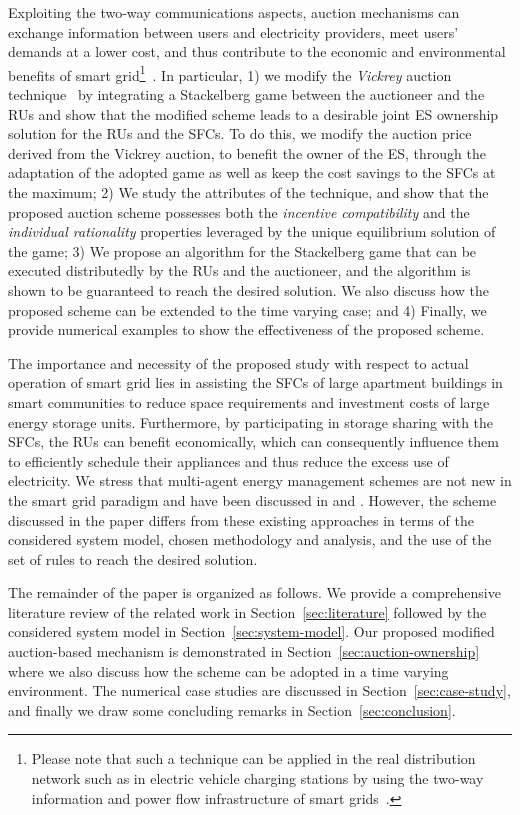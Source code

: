 \documentclass[journal,10pt]{IEEEtran}
\begin{document}
Exploiting the two-way communications aspects, auction mechanisms can exchange information between users and electricity providers, meet users' demands at a lower cost, and thus contribute to the economic and environmental benefits of smart grid\footnote{Please note that such a technique can be applied in the real distribution network such as in electric vehicle charging stations by using the two-way information and power flow infrastructure of smart grids~\cite{Fang-J-CST:2012}.}~\cite{Ma-JTSG:2014}. In particular, 1) we modify the \emph{Vickrey} auction technique~\cite{Vickrey-JF:1961} by integrating a Stackelberg game between the auctioneer and the RUs and show that the modified scheme leads to a desirable joint ES ownership solution for the RUs and the SFCs. To do this, we modify the auction price derived from the Vickrey auction, to benefit the owner of the ES, through the adaptation of the adopted game as well as keep the cost savings to the SFCs at the maximum; 2)  We study the attributes of the technique, and show that the proposed auction scheme possesses both the \emph{incentive compatibility} and the \emph{individual rationality} properties leveraged by the unique equilibrium solution of the game; 3) We propose an algorithm for the Stackelberg game that can be executed distributedly by the RUs and the auctioneer, and the algorithm is shown to be guaranteed to reach the desired solution. We also discuss how the proposed scheme can be extended to the time varying case; and 4) Finally, we provide numerical examples to show the effectiveness of the proposed scheme.

The importance and necessity of the proposed study with respect to actual operation of smart grid lies in assisting the SFCs of large apartment buildings in smart communities to reduce space requirements and investment costs of large energy storage units. Furthermore, by participating in storage sharing with the SFCs, the RUs can benefit economically, which can consequently influence them to efficiently schedule their appliances and thus reduce the excess use of electricity. We stress that multi-agent energy management schemes are not new in the smart grid paradigm and have been discussed in \cite{Tushar-TIE:2014,chaibo-TSG:2014} and \cite{Maharjan-JTSG:2013}. However, the scheme discussed in the paper differs from these existing approaches in terms of the considered system model, chosen methodology and analysis, and the use of the set of rules to reach the desired solution.

The remainder of the paper is organized as follows. We provide a comprehensive literature review of the related work in Section~\ref{sec:literature} followed by the considered system model in Section~\ref{sec:system-model}. Our proposed modified auction-based mechanism is demonstrated in Section~\ref{sec:auction-ownership} where we also discuss how the scheme can be adopted in a time varying environment. The numerical case studies are discussed in Section~\ref{sec:case-study}, and finally we draw some concluding remarks in Section~\ref{sec:conclusion}.
\end{document}
